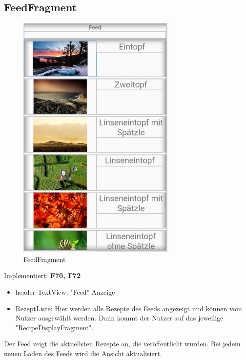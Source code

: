 \subsection{FeedFragment}
\begin{figure}[H]
	\centering
	\includegraphics[width=0.7\textwidth]{pics/feedFragment.png}%
	\caption{FeedFragment}%
	\label{view}%
\end{figure}
Implementiert: \textbf{F70, F72}
\begin{itemize}[nosep]
	\item header-TextView: "Feed" Anzeige
	\item	RezeptListe: Hier werden alle Rezepte des Feeds angezeigt und können vom Nutzer ausgewählt werden. Dann kommt der Nutzer auf das jeweilige "RecipeDisplayFragment".
\end{itemize}
Der Feed zeigt die aktuellsten Rezepte an, die veröffentlicht wurden. Bei jedem neuen Laden des Feeds wird die Ansicht aktualisiert.


